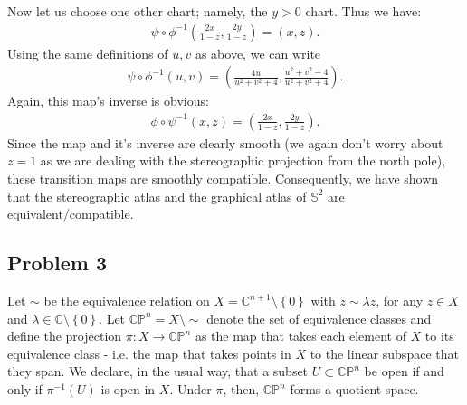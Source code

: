 \documentclass{mathnotes}
\begin{document}
Now let us choose one other chart; namely, the $y>0$ chart. Thus we have:
\begin{align*}
    \psi\circ\phi^{-1}\left( \frac{2x}{1-z},\frac{2y}{1-z} \right)=(x,z).
\end{align*}
Using the same definitions of $u, v$ as above, we can write
\begin{align*}
    \psi\circ\phi^{-1}\left( u, v \right)=\left(\frac{4u}{u^2+v^2+4},\frac{u^2+v^2-4}{u^2+v^2+4}\right).
\end{align*}
Again, this map's inverse is obvious:
\begin{align*}
    \phi\circ\psi^{-1}(x,z)=\left( \frac{2x}{1-z},\frac{2y}{1-z} \right).
\end{align*}
Since the map and it's inverse are clearly smooth (we again don't worry about $z=1$ as we are dealing with the stereographic projection from the north pole), these
transition maps are smoothly compatible. Consequently, we have shown that the stereographic atlas and the graphical atlas of $\mathbb{S}^2$ are equivalent/compatible.

\subsection*{Problem 3}

Let $\sim$ be the equivalence relation on $X=\mathbb{C}^{n+1}\setminus\left\{ 0 \right\}$ with $z\sim \lambda z$, for any $z\in X$ and $\lambda\in\mathbb{C}\setminus\left\{ 0 \right\}$. Let
$\mathbb{C}\mathbb{P}^n=X\setminus\sim$ denote the set of equivalence classes and define the projection $\pi: X\to\mathbb{C}\mathbb{P}^n$ as the map that
takes each element of $X$ to its equivalence class - i.e. the map that takes points in $X$ to the linear subspace that they span.
We declare, in the usual way, that a subset $U\subset\mathbb{C}\mathbb{P}^n$ be open if and only if $\pi^{-1}(U)$ is open in $X$. Under $\pi$, then, $\mathbb{C}\mathbb{P}^n$ forms a quotient space.
\end{document}
